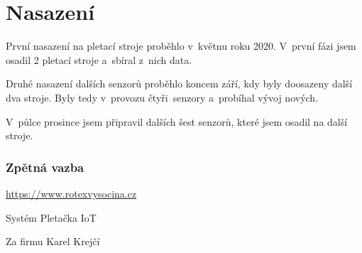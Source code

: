 \chapter{Nasazení}
První nasazení na pletací stroje proběhlo v~květnu roku 2020.
V~první fázi jsem osadil 2 pletací stroje a~sbíral z~nich data.

Druhé nasazení dalších senzorů proběhlo koncem září, kdy byly doosazeny další dva stroje.
Byly tedy v~provozu čtyři~senzory a~probíhal vývoj nových.

V~půlce prosince jsem připravil dalších šest senzorů, které jsem osadil na další stroje.


\subsection{Zpětná vazba}
\newline
\url{https://www.rotexvysocina.cz}

Systém Pletačka IoT 

{\raggedleft Za firmu Karel Krejčí\par}



\newpage